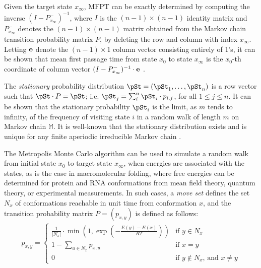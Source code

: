 Given the target state $x_{\infty}$, MFPT can be exactly
determined by computing the inverse
$(I - P^{-}_{x_{\infty}})^{-1}$, where $I$ is the $(n-1)\times (n-1)$ identity
matrix and $P^{-}_{x_{\infty}}$
denotes the $(n-1)\times (n-1)$ matrix obtained from the
Markov chain transition probability matrix $P$,
by deleting the row and column with index $x_{\infty}$.
Letting ${\bf e}$ denote the
$(n-1) \times 1$ column vector consisting entirely of $1$'s, it can be
shown that mean first passage time from state $x_0$ to state $x_{\infty}$
is the $x_0$-th coordinate
of column vector
$(I - P^{-}_{x_{\infty}})^{-1} \cdot {\bf e}$ \citep{meyerMFPT}.


The {\em stationary} probability distribution $\pSt = (\pSt_1,\ldots,\pSt_n)$
is a row vector such that $\pSt \cdot P = \pSt$; i.e.
$\pSt_j = \sum_{i}^n \pSt_i \cdot p_{i,j}$, for all $1\leq j \leq n$.
It can be shown that the stationary probability $\pSt_i$ is the limit,
as $m$ tends to infinity, of the frequency of visiting state $i$ in a
random walk of length $m$ on Markov chain $\mathbb{M}$.
It is well-known that the stationary distribution exists and is unique
for any finite aperiodic irreducible Markov chain \citep{cloteBackofen:book}.

The Metropolis Monte Carlo algorithm \citep{metropolis:MonteCarlo} can
be used to simulate a random walk from initial state $x_0$ to target state
$x_{\infty}$, when energies are associated with the states, as is the case in
macromolecular folding, where free energies can be determined for
protein and RNA conformations from mean field theory, quantum theory,
or experimental measurements. In such cases, a {\em move set}
defines the set $N_x$ of conformations reachable in unit time
from conformation $x$, and the transition probability matrix
$P = (p_{x,y})$ is defined as follows:
\begin{align}
\label{eq:transitionProb1}
p_{x,y} = \left\{
\begin{array}{ll}
\frac{1}{|N_x|} \cdot \min\left(1,\exp(-\frac{E(y)-E(x)}{RT})\right)
&\mbox{if $y \in N_x$}\\
1 - \sum_{u \in N_x} p_{x,u} &\mbox{if $x=y$}\\
0 &\mbox{if $y \not\in N_x$, and $x \ne y$}
\end{array} \right.
\end{align}


